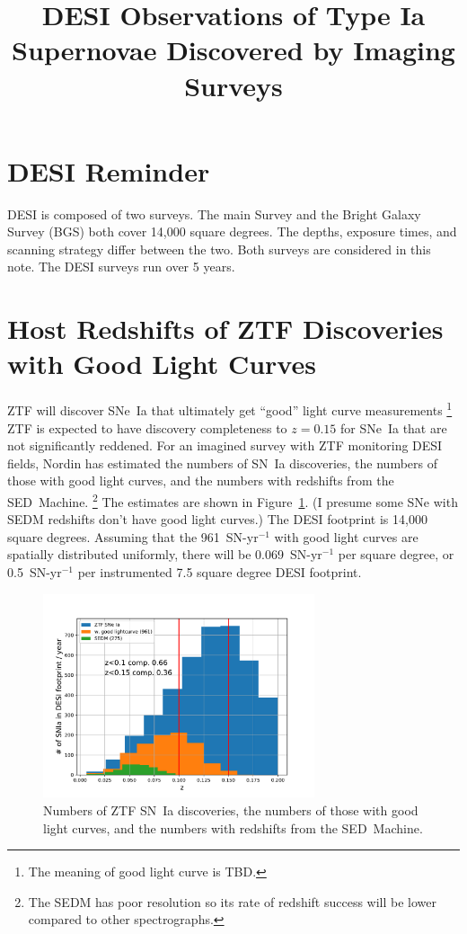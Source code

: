 \documentclass{article}   	%
\title{DESI Observations of Type Ia Supernovae Discovered by Imaging Surveys}
\begin{document}
\maketitle

\section{DESI Reminder}
DESI is composed of two surveys.  The main Survey and the Bright Galaxy Survey (BGS) both cover 14,000 square degrees.  The
depths, exposure times, and scanning strategy differ between the two.  Both surveys are considered in this note.  The DESI surveys
run over 5 years.

\section{Host Redshifts of ZTF Discoveries with Good Light Curves}
ZTF will discover SNe~Ia that ultimately get ``good'' light curve measurements
\footnote{
\color{red} The meaning of good light curve is TBD. \color{black}}
 ZTF is expected to have discovery completeness to $z=0.15$
\color{red}
for SNe~Ia that are not significantly reddened.
\color{black}
For an imagined survey with ZTF monitoring DESI fields, Nordin has estimated the
numbers of SN~Ia discoveries, the numbers of those with good light curves, and the numbers with redshifts from the SED~Machine.
\footnote{
\color{red}
The SEDM has poor resolution so its rate of redshift success will be lower compared to other spectrographs.
\color{black}
}
The estimates are shown in Figure~\ref{ZTFnum:fig}.  (I presume some SNe with SEDM redshifts don't have good light curves.) 
The DESI footprint
is 14,000 square degrees.  
\color{red}
Assuming that the 961~SN-yr$^{-1}$  with good light curves are spatially distributed uniformly,
there will be 0.069~SN-yr$^{-1}$ per square degree, or 0.5~SN-yr$^{-1}$ per instrumented 7.5 square degree  DESI footprint.
\color{black}

\begin{figure}[h]
\includegraphics[width=8cm]{zdist_12m_185_195.pdf}
\centering
\caption{Numbers of ZTF SN~Ia discoveries, the numbers of those with good light curves, and the numbers with redshifts from the SED~Machine.
\label{ZTFnum:fig}}
\end{figure}
\end{document}
